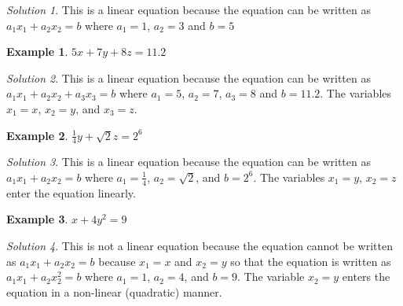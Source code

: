 \documentclass[
]{book}
\theoremstyle{definition}
\theoremstyle{definition}
\newtheorem{example}{Example}[chapter]
\theoremstyle{definition}
\theoremstyle{remark}
\newtheorem*{solution}{Solution}
\begin{document}
\begin{solution}

This is a linear equation because the equation can be written as \(a_1 x_1 + a_2 x_2 = b\) where \(a_1 = 1\), \(a_2 = 3\) and \(b = 5\)

\end{solution}

\begin{example}
\protect\hypertarget{exm:unnamed-chunk-26}{}{\label{exm:unnamed-chunk-26} }\(5x + 7y + 8z = 11.2\)
\end{example}

\begin{solution}

This is a linear equation because the equation can be written as \(a_1 x_1 + a_2 x_2 + a_3 x_3= b\) where \(a_1 = 5\), \(a_2 = 7\), \(a_3 = 8\) and \(b = 11.2\). The variables \(x_1 = x\), \(x_2 = y\), and \(x_3 = z\).

\end{solution}

\begin{example}
\protect\hypertarget{exm:unnamed-chunk-27}{}{\label{exm:unnamed-chunk-27} }\(\frac{1}{4} y + \sqrt{2} z = 2^6\)
\end{example}

\begin{solution}

This is a linear equation because the equation can be written as \(a_1 x_1 + a_2 x_2 = b\) where \(a_1 = \frac{1}{4}\), \(a_2 = \sqrt{2}\), and \(b = 2^6\). The variables \(x_1 = y\), \(x_2 = z\) enter the equation linearly.

\end{solution}

\begin{example}
\protect\hypertarget{exm:unnamed-chunk-28}{}{\label{exm:unnamed-chunk-28} }\(x + 4 y^2 = 9\)
\end{example}

\begin{solution}

This is not a linear equation because the equation cannot be written as \(a_1 x_1 + a_2 x_2 = b\) because \(x_1 = x\) and \(x_2 = y\) so that the equation is written as \(a_1 x_1 + a_2 x_2^2 = b\) where \(a_1 = 1\), \(a_2 = 4\), and \(b = 9\). The variable \(x_2 = y\) enters the equation in a non-linear (quadratic) manner.

\end{solution}
\end{document}
